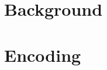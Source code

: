 \documentclass[a4paper,12pt,titlepage,]{scrreprt}
\begin{document}

\tableofcontents
\thispagestyle{empty}
\pagebreak




\chapter{Background}




\chapter{Encoding}




\end{document}
